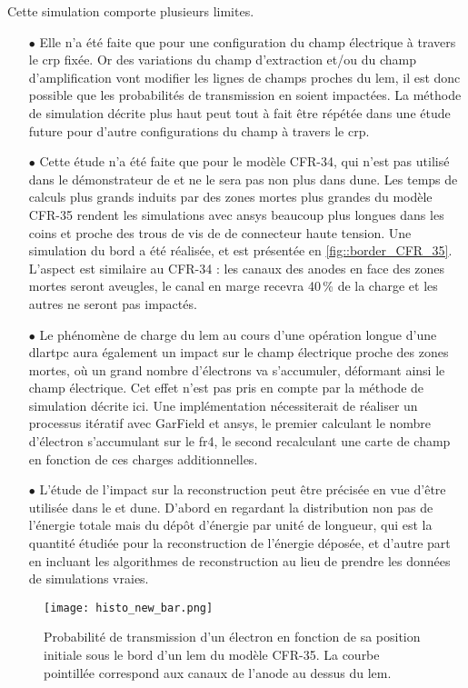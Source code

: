      Cette simulation comporte plusieurs limites.
      \begin{itemize}
        \item[$\bullet$] Elle n'a été faite que pour une configuration du champ électrique à travers le \gls{crp} fixée. Or des variations du champ d'extraction et/ou du champ d'amplification vont modifier les lignes de champs proches du \gls{lem}, il est donc possible que les probabilités de transmission en soient impactées. La méthode de simulation décrite plus haut peut tout à fait être répétée dans une étude future pour d'autre configurations du champ à travers le \gls{crp}.
        \item[$\bullet$] Cette étude n'a été faite que pour le modèle CFR-34, qui n'est pas utilisé dans le démonstrateur de \SSS{} et ne le sera pas non plus dans \gls{dune}. Les temps de calculs plus grands induits par des zones mortes plus grandes du modèle CFR-35 rendent les simulations avec \gls{ansys} beaucoup plus longues dans les coins et proche des trous de vis de de connecteur haute tension. Une simulation du bord a été réalisée, et est présentée en \autoref{fig::border_CFR_35}. L'aspect est similaire au CFR-34 : les canaux des anodes en face des zones mortes seront aveugles, le canal en marge recevra 40\,\% de la charge et les autres ne seront pas impactés.
        \item[$\bullet$] Le phénomène de charge du \gls{lem} au cours d'une opération longue d'une \gls{dlartpc} aura également un impact sur le champ électrique proche des zones mortes, où un grand nombre d'électrons va s'accumuler, déformant ainsi le champ électrique. Cet effet n'est pas pris en compte par la méthode de simulation décrite ici. Une implémentation nécessiterait de réaliser un processus itératif avec GarField et \gls{ansys}, le premier calculant le nombre d'électron s'accumulant sur le \gls{fr4}, le second recalculant une carte de champ en fonction de ces charges additionnelles.
        \item[$\bullet$] L'étude de l'impact sur la reconstruction peut être précisée en vue d'être utilisée dans le \SSS{} et \gls{dune}. D'abord en regardant la distribution non pas de l'énergie totale mais du dépôt d'énergie par unité de longueur, qui est la quantité étudiée pour la reconstruction de l'énergie déposée, et d'autre part en incluant les algorithmes de reconstruction au lieu de prendre les données de simulations vraies.
      \end{itemize}
      
      \begin{figure}[htpb]
        \centering
        \texttt{[image: histo\_new\_bar.png]}
        \caption[Probabilité de transmission d'un électron en fonction de sa position initiale sous le bord d'un LEM du modèle CFR-35]{\label{fig::border_CFR_35}Probabilité de transmission d'un électron en fonction de sa position initiale sous le bord d'un \gls{lem} du modèle CFR-35. La courbe pointillée correspond aux canaux de l'anode au dessus du \gls{lem}.}
      \end{figure}
        
